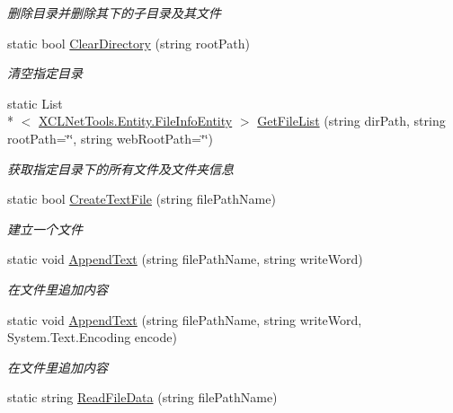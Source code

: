 \begin{DoxyCompactItemize}
\begin{DoxyCompactList}\small\item\em 删除目录并删除其下的子目录及其文件 \end{DoxyCompactList}\item 
static bool \hyperlink{class_x_c_l_net_tools_1_1_file_handler_1_1_file_directory_a1f64c69d3e2dc580b54a93fe0c871178}{Clear\-Directory} (string root\-Path)
\begin{DoxyCompactList}\small\item\em 清空指定目录 \end{DoxyCompactList}\item 
static List\\*
$<$ \hyperlink{class_x_c_l_net_tools_1_1_entity_1_1_file_info_entity}{X\-C\-L\-Net\-Tools.\-Entity.\-File\-Info\-Entity} $>$ \hyperlink{class_x_c_l_net_tools_1_1_file_handler_1_1_file_directory_ac145cab935d17a93ec683d1763bfdccd}{Get\-File\-List} (string dir\-Path, string root\-Path=\char`\"{}\char`\"{}, string web\-Root\-Path=\char`\"{}\char`\"{})
\begin{DoxyCompactList}\small\item\em 获取指定目录下的所有文件及文件夹信息 \end{DoxyCompactList}\item 
static bool \hyperlink{class_x_c_l_net_tools_1_1_file_handler_1_1_file_directory_a40110c2de9ef47ac099acdbbf0703a0c}{Create\-Text\-File} (string file\-Path\-Name)
\begin{DoxyCompactList}\small\item\em 建立一个文件 \end{DoxyCompactList}\item 
static void \hyperlink{class_x_c_l_net_tools_1_1_file_handler_1_1_file_directory_a7153ad7012f2c7259a89cc1f44fa57e2}{Append\-Text} (string file\-Path\-Name, string write\-Word)
\begin{DoxyCompactList}\small\item\em 在文件里追加内容 \end{DoxyCompactList}\item 
static void \hyperlink{class_x_c_l_net_tools_1_1_file_handler_1_1_file_directory_a15ae657816572db98e886f45b2949f76}{Append\-Text} (string file\-Path\-Name, string write\-Word, System.\-Text.\-Encoding encode)
\begin{DoxyCompactList}\small\item\em 在文件里追加内容 \end{DoxyCompactList}\item 
static string \hyperlink{class_x_c_l_net_tools_1_1_file_handler_1_1_file_directory_a5658b6c4ee9c9d4035033e5eb5ac773b}{Read\-File\-Data} (string file\-Path\-Name)

\end{DoxyCompactItemize}
